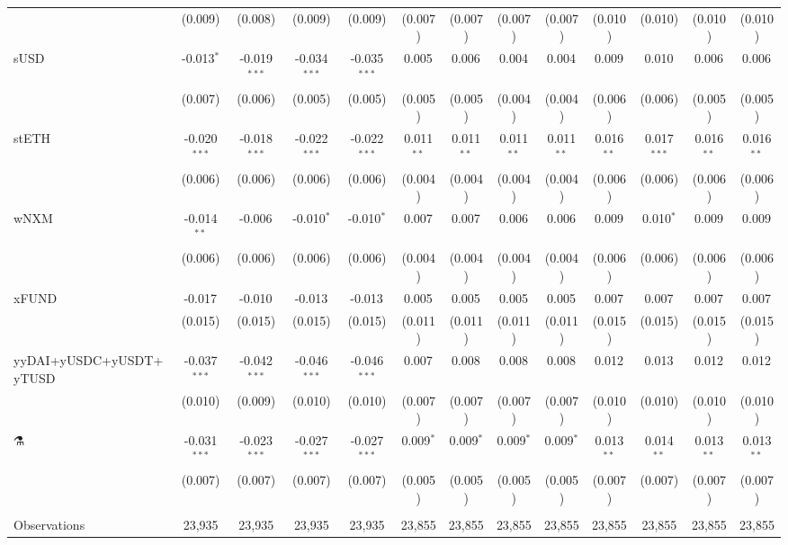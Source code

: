 \begin{table}[!htbp]
\begin{tabular}{@{\extracolsep{5pt}}lcccccccccccc}
  & (0.009) & (0.008) & (0.009) & (0.009) & (0.007) & (0.007) & (0.007) & (0.007) & (0.010) & (0.010) & (0.010) & (0.010) \\
 sUSD & -0.013$^{*}$ & -0.019$^{***}$ & -0.034$^{***}$ & -0.035$^{***}$ & 0.005$^{}$ & 0.006$^{}$ & 0.004$^{}$ & 0.004$^{}$ & 0.009$^{}$ & 0.010$^{}$ & 0.006$^{}$ & 0.006$^{}$ \\
  & (0.007) & (0.006) & (0.005) & (0.005) & (0.005) & (0.005) & (0.004) & (0.004) & (0.006) & (0.006) & (0.005) & (0.005) \\
 stETH & -0.020$^{***}$ & -0.018$^{***}$ & -0.022$^{***}$ & -0.022$^{***}$ & 0.011$^{**}$ & 0.011$^{**}$ & 0.011$^{**}$ & 0.011$^{**}$ & 0.016$^{**}$ & 0.017$^{***}$ & 0.016$^{**}$ & 0.016$^{**}$ \\
  & (0.006) & (0.006) & (0.006) & (0.006) & (0.004) & (0.004) & (0.004) & (0.004) & (0.006) & (0.006) & (0.006) & (0.006) \\
 wNXM & -0.014$^{**}$ & -0.006$^{}$ & -0.010$^{*}$ & -0.010$^{*}$ & 0.007$^{}$ & 0.007$^{}$ & 0.006$^{}$ & 0.006$^{}$ & 0.009$^{}$ & 0.010$^{*}$ & 0.009$^{}$ & 0.009$^{}$ \\
  & (0.006) & (0.006) & (0.006) & (0.006) & (0.004) & (0.004) & (0.004) & (0.004) & (0.006) & (0.006) & (0.006) & (0.006) \\
 xFUND & -0.017$^{}$ & -0.010$^{}$ & -0.013$^{}$ & -0.013$^{}$ & 0.005$^{}$ & 0.005$^{}$ & 0.005$^{}$ & 0.005$^{}$ & 0.007$^{}$ & 0.007$^{}$ & 0.007$^{}$ & 0.007$^{}$ \\
  & (0.015) & (0.015) & (0.015) & (0.015) & (0.011) & (0.011) & (0.011) & (0.011) & (0.015) & (0.015) & (0.015) & (0.015) \\
 yyDAI+yUSDC+yUSDT+yTUSD & -0.037$^{***}$ & -0.042$^{***}$ & -0.046$^{***}$ & -0.046$^{***}$ & 0.007$^{}$ & 0.008$^{}$ & 0.008$^{}$ & 0.008$^{}$ & 0.012$^{}$ & 0.013$^{}$ & 0.012$^{}$ & 0.012$^{}$ \\
  & (0.010) & (0.009) & (0.010) & (0.010) & (0.007) & (0.007) & (0.007) & (0.007) & (0.010) & (0.010) & (0.010) & (0.010) \\
 ⚗️ & -0.031$^{***}$ & -0.023$^{***}$ & -0.027$^{***}$ & -0.027$^{***}$ & 0.009$^{*}$ & 0.009$^{*}$ & 0.009$^{*}$ & 0.009$^{*}$ & 0.013$^{**}$ & 0.014$^{**}$ & 0.013$^{**}$ & 0.013$^{**}$ \\
  & (0.007) & (0.007) & (0.007) & (0.007) & (0.005) & (0.005) & (0.005) & (0.005) & (0.007) & (0.007) & (0.007) & (0.007) \\
\hline \\[-1.8ex]
 Observations & 23,935 & 23,935 & 23,935 & 23,935 & 23,855 & 23,855 & 23,855 & 23,855 & 23,855 & 23,855 & 23,855 & 23,855 \\

\end{tabular}
\end{table}
